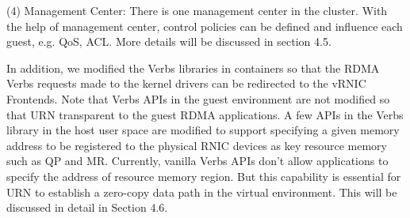 (4) Management Center: There is one management center in the cluster. With the help of management center, control policies can be defined and influence each guest, e.g. QoS, ACL. More details will be discussed in section 4.5.

In addition,  we modified the Verbs libraries in containers so that the RDMA Verbs requests made to the kernel drivers can be redirected to the vRNIC Frontends. Note that Verbs APIs in the guest environment are not modified so that URN transparent to the guest RDMA applications. A few APIs in the Verbs library in the host user space are modified to support specifying a given memory address to be registered to the physical RNIC devices as key resource memory such as QP and MR. Currently, vanilla Verbs APIs don't allow applications to specify the address of resource memory region. But this capability is essential for URN to establish a zero-copy data path in the virtual environment. This will be discussed in detail in Section 4.6.
